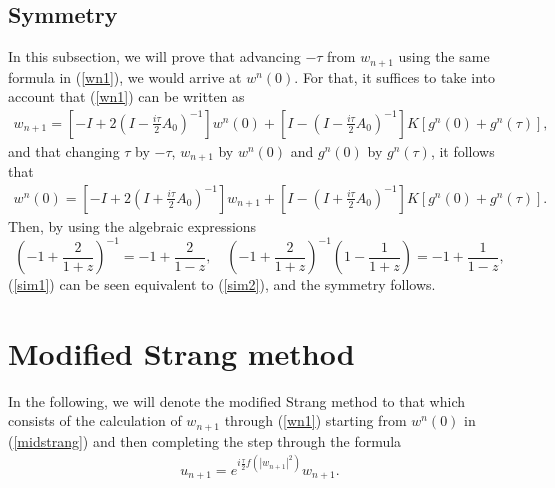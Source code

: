 \documentclass[10pt,a4paper]{amsart}
\begin{document}
\subsection{Symmetry}
In this subsection, we will prove that advancing $-\tau$ from $w_{n+1}$ using the same formula in (\ref{wn1}), we would arrive at $w^n(0)$.
For that, it suffices to take into account that (\ref{wn1}) can be written as
\begin{eqnarray}
w_{n+1}=[-I +2(I-\frac{i \tau}{2}A_0)^{-1}]w^n(0)+[I-(I-\frac{i \tau}{2}A_0)^{-1}]K [g^n(0)+g^n(\tau)],
\label{sim1}
\end{eqnarray}
and that changing $\tau$ by $-\tau$, $w_{n+1}$ by $w^n(0)$ and $g^n(0)$ by $g^n(\tau)$, it follows that
\begin{eqnarray}
w^n(0)=[-I +2(I+\frac{i \tau}{2}A_0)^{-1}]w_{n+1}+[I-(I+\frac{i \tau}{2}A_0)^{-1}]K [g^n(0)+g^n(\tau)].
\label{sim2}
\end{eqnarray}
Then, by using the algebraic expressions
$$
(-1+\frac{2}{1+z})^{-1}=-1+\frac{2}{1-z}, \quad (-1+\frac{2}{1+z})^{-1}(1-\frac{1}{1+z})=-1+\frac{1}{1-z},$$
(\ref{sim1}) can be seen equivalent to (\ref{sim2}), and the symmetry follows.






\section{Modified Strang method}



In the following, we will denote the modified Strang method to that which consists of the calculation of $w_{n+1}$ through (\ref{wn1}) starting from $w^n(0)$ in (\ref{midstrang}) and then completing the step through the formula
\begin{eqnarray}
u_{n+1}=e^{i \frac{\tau}{2}f(|w_{n+1}|^2)} w_{n+1}. \label{finalu}
\end{eqnarray}
\end{document}
